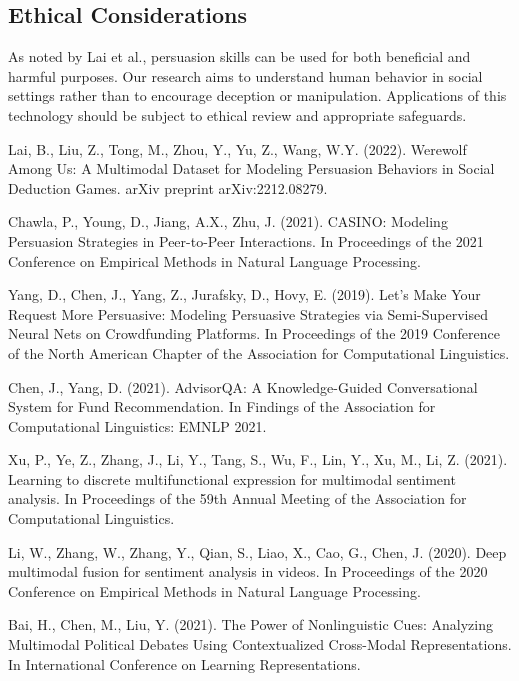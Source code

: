 \documentclass{article}
\begin{document}
\subsection{Ethical Considerations}
As noted by Lai et al., persuasion skills can be used for both beneficial and harmful purposes. Our research aims to understand human behavior in social settings rather than to encourage deception or manipulation. Applications of this technology should be subject to ethical review and appropriate safeguards.



\begin{thebibliography}{10}

Lai, B., Liu, Z., Tong, M., Zhou, Y., Yu, Z., Wang, W.Y. (2022). Werewolf Among Us: A Multimodal Dataset for Modeling Persuasion Behaviors in Social Deduction Games. arXiv preprint arXiv:2212.08279.

Chawla, P., Young, D., Jiang, A.X., Zhu, J. (2021). CASINO: Modeling Persuasion Strategies in Peer-to-Peer Interactions. In Proceedings of the 2021 Conference on Empirical Methods in Natural Language Processing.

Yang, D., Chen, J., Yang, Z., Jurafsky, D., Hovy, E. (2019). Let's Make Your Request More Persuasive: Modeling Persuasive Strategies via Semi-Supervised Neural Nets on Crowdfunding Platforms. In Proceedings of the 2019 Conference of the North American Chapter of the Association for Computational Linguistics.

Chen, J., Yang, D. (2021). AdvisorQA: A Knowledge-Guided Conversational System for Fund Recommendation. In Findings of the Association for Computational Linguistics: EMNLP 2021.

Xu, P., Ye, Z., Zhang, J., Li, Y., Tang, S., Wu, F., Lin, Y., Xu, M., Li, Z. (2021). Learning to discrete multifunctional expression for multimodal sentiment analysis. In Proceedings of the 59th Annual Meeting of the Association for Computational Linguistics.

Li, W., Zhang, W., Zhang, Y., Qian, S., Liao, X., Cao, G., Chen, J. (2020). Deep multimodal fusion for sentiment analysis in videos. In Proceedings of the 2020 Conference on Empirical Methods in Natural Language Processing.

Bai, H., Chen, M., Liu, Y. (2021). The Power of Nonlinguistic Cues: Analyzing Multimodal Political Debates Using Contextualized Cross-Modal Representations. In International Conference on Learning Representations.


\end{thebibliography}
\end{document}
